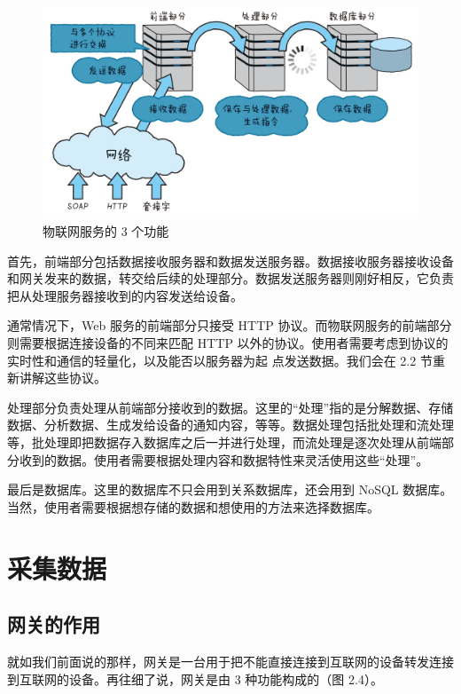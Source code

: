 \documentclass[12pt,UTF8]{ctexbook}
\begin{document}
\begin{figure}[htbp]
	\centering
	\includegraphics[width=1\linewidth]{22}
	\caption{物联网服务的 3 个功能}
	\label{fig:1}
\end{figure}

首先，前端部分包括数据接收服务器和数据发送服务器。数据接收服务器接收设备和网关发来的数据，转交给后续的处理部分。数据发送服务器则刚好相反，它负责把从处理服务器接收到的内容发送给设备。

通常情况下，Web 服务的前端部分只接受 HTTP 协议。而物联网服务的前端部分则需要根据连接设备的不同来匹配 HTTP 以外的协议。使用者需要考虑到协议的实时性和通信的轻量化，以及能否以服务器为起
点发送数据。我们会在 2.2 节重新讲解这些协议。

处理部分负责处理从前端部分接收到的数据。这里的“处理”指的是分解数据、存储数据、分析数据、生成发给设备的通知内容，等等。数据处理包括批处理和流处理等，批处理即把数据存入数据库之后一并进行处理，而流处理是逐次处理从前端部分收到的数据。使用者需要根据处理内容和数据特性来灵活使用这些“处理”。

最后是数据库。这里的数据库不只会用到关系数据库，还会用到 NoSQL 数据库。当然，使用者需要根据想存储的数据和想使用的方法来选择数据库。

\section{采集数据}

\subsection{网关的作用}

就如我们前面说的那样，网关是一台用于把不能直接连接到互联网的设备转发连接到互联网的设备。再往细了说，网关是由 3 种功能构成的（图 2.4）。
\end{document}

